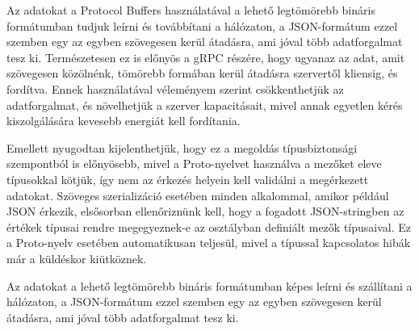 \documentclass[tocnopagenum]{thesis-ekf}
\begin{document}
	Az adatokat a Protocol Buffers használatával a lehető legtömörebb bináris formátumban tudjuk leírni és továbbítani a hálózaton, a JSON-formátum ezzel szemben egy az egyben szövegesen kerül átadásra, ami jóval több adatforgalmat tesz ki. Természetesen ez is előnyös a gRPC részére, hogy ugyanaz az adat, amit szövegesen közölnénk, tömörebb formában kerül átadásra szervertől kliensig, és fordítva. Ennek használatával véleményem szerint csökkenthetjük az adatforgalmat, és növelhetjük a szerver kapacitásait, mivel annak egyetlen kérés kiszolgálására kevesebb energiát kell fordítania.
	
	Emellett nyugodtan kijelenthetjük, hogy ez a megoldás típusbiztonsági szempontból is előnyösebb, mivel a Proto-nyelvet használva a mezőket eleve típusokkal kötjük, így nem az érkezés helyein kell validálni a megérkezett adatokat. Szöveges szerializáció esetében minden alkalommal, amikor például JSON érkezik, elsősorban ellenőriznünk kell, hogy a fogadott JSON-stringben az értékek típusai rendre megegyeznek-e az osztályban definiált mezők típusaival. Ez a Proto-nyelv esetében automatikusan teljesül, mivel a típussal kapcsolatos hibák már a küldéskor kiütköznek.
	
	Az adatokat a lehető legtömörebb bináris formátumban képes leírni és szállítani a hálózaton, a JSON-formátum ezzel szemben egy az egyben szövegesen kerül átadásra, ami jóval több adatforgalmat tesz ki. \cite{grpc_rest}
\end{document}
